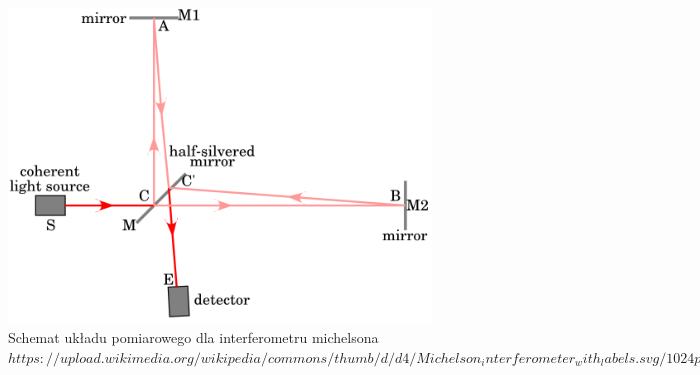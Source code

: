 \documentclass[a4paper]{article}
\newlength{\du}
\begin{document}
\begin{figure}[h]
\centering
\includegraphics[scale=0.2]{Michelson_interferometer.png}
\caption{Schemat układu pomiarowego dla interferometru michelsona $https://upload.wikimedia.org/wikipedia/commons/thumb/d/d4/Michelson_interferometer_with_labels.svg/1024px-Michelson_interferometer_with_labels.svg.png$}
\label{michelson}
\end{figure}
\end{document}
